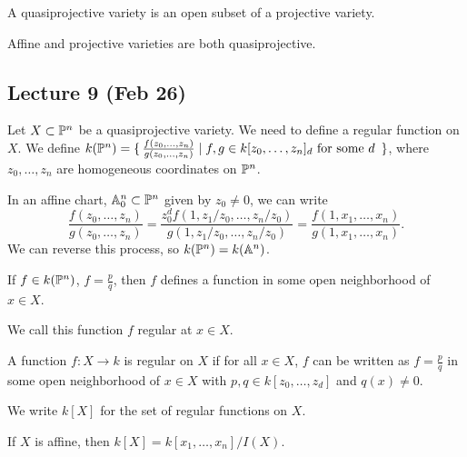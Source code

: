 \documentclass[twoside, 10pt]{article}
\begin{document}
    \begin{defn}
        A quasiprojective variety is an open subset of a projective variety.
    \end{defn}

    \begin{exm}
        Affine and projective varieties are both quasiprojective.
    \end{exm}

    \subsection{Lecture 9 (Feb 26)}
    Let $X \subset \P^n$ be a quasiprojective variety. We need to define a regular function on $X$. We define $k(\P^n) = \set{\frac{f(z_0, \ldots, z_n)}{g(z_0, \ldots, z_n)} | f,g \in k[z_0, \ldots, z_n]_d \text{ for some $d$ }}$, where $z_0, \ldots, z_n$ are homogeneous coordinates on $\P^n$.

    \begin{rmk}
        In an affine chart, $\A_0^n \subset \P^n$ given by $z_0 \neq 0$, we can write
    \[ \frac{f(z_0, \ldots, z_n)}{g(z_0, \ldots, z_n)} = \frac{z_0^df(1,z_1/z_0, \ldots, z_n/z_0)}{g(1, z_1/z_0, \ldots, z_n/z_0)} = \frac{f(1, x_1, \ldots, x_n)}{g(1, x_1, \ldots, x_n)}. \]
        We can reverse this process, so $k(\P^n) = k(\A^n)$.
    \end{rmk}

    If $f \in k(\P^n)$, $f = \frac{p}{q}$, then $f$ defines a function in some open neighborhood of $x \in X$.
    \begin{defn}
        We call this function $f$ regular at $x \in X$.
    \end{defn}

    \begin{defn}
        A function $f:X \to k$ is regular on $X$ if for all $x \in X$, $f$ can be written as $f = \frac{p}{q}$ in some open neighborhood of $x \in X$ with $p,q \in k[z_0, \ldots, z_d]$ and $q(x) \neq 0$.
    \end{defn}

    \begin{rmk}
        We write $k[X]$ for the set of regular functions on $X$.
    \end{rmk}

    \begin{rmk}
        If $X$ is affine, then $k[X] = k[x_1, \ldots, x_n]/I(X)$.
    \end{rmk}
\end{document}
